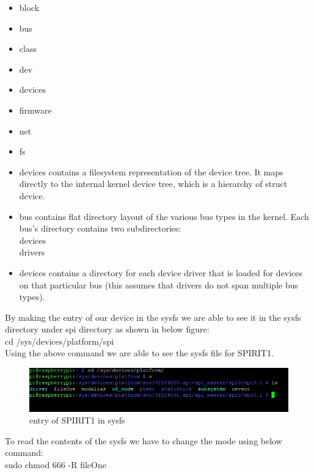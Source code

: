 		\begin{itemize}
		\item block
		\item bus
		\item class
		\item dev
		\item devices
		\item firmware
		\item net
		\item fs
		\item devices
		contains a filesystem representation of the device tree. It maps
		directly to the internal kernel device tree, which is a hierarchy of
		struct device.
		\item bus
		contains flat directory layout of the various bus types in the
		kernel. Each bus's directory contains two subdirectories:\\
		devices\\
		drivers
		\item devices 
		contains a directory for each device driver that is loaded
		for devices on that particular bus (this assumes that drivers do not
		span multiple bus types).
		\end{itemize}
		By making the entry of our device in the sysfs we are able to see it in the sysfs directory under spi directory as shown in below figure:\\
		cd /sys/devices/platform/spi \\
		Using the above command we are able to see the sysfs file for SPIRIT1.

			\begin{figure}[ht]
				\centering
				\includegraphics[scale=1]{images/sysfs.png}
				\caption{entry of SPIRIT1 in sysfs}
			\end{figure}
			To read the contents of the sysfs we have to change the mode using below command: \\
			sudo chmod 666 -R fileOne
